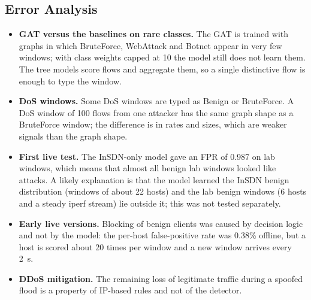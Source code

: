 \subsection{Error Analysis}
\begin{itemize}
	\item \textbf{GAT versus the baselines on rare classes.} The GAT is trained with graphs in which BruteForce, WebAttack and Botnet appear in very few windows; with class weights capped at 10 the model still does not learn them. The tree models score flows and aggregate them, so a single distinctive flow is enough to type the window.
	\item \textbf{DoS windows.} Some DoS windows are typed as Benign or BruteForce. A DoS window of 100 flows from one attacker has the same graph shape as a BruteForce window; the difference is in rates and sizes, which are weaker signals than the graph shape.
	\item \textbf{First live test.} The InSDN-only model gave an FPR of 0.987 on lab windows, which means that almost all benign lab windows looked like attacks. A likely explanation is that the model learned the InSDN benign distribution (windows of about 22 hosts) and the lab benign windows (6 hosts and a steady iperf stream) lie outside it; this was not tested separately.
	\item \textbf{Early live versions.} Blocking of benign clients was caused by decision logic and not by the model: the per-host false-positive rate was 0.38\% offline, but a host is scored about 20 times per window and a new window arrives every 2~s.
	\item \textbf{DDoS mitigation.} The remaining loss of legitimate traffic during a spoofed flood is a property of IP-based rules and not of the detector.
\end{itemize}

